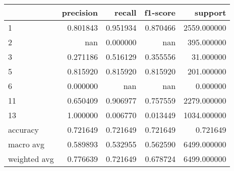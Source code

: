 \begin{tabular}{lrrrr}
\toprule
 & precision & recall & f1-score & support \\
\midrule
1 & 0.801843 & 0.951934 & 0.870466 & 2559.000000 \\
2 & nan & 0.000000 & nan & 395.000000 \\
3 & 0.271186 & 0.516129 & 0.355556 & 31.000000 \\
5 & 0.815920 & 0.815920 & 0.815920 & 201.000000 \\
6 & 0.000000 & nan & nan & 0.000000 \\
11 & 0.650409 & 0.906977 & 0.757559 & 2279.000000 \\
13 & 1.000000 & 0.006770 & 0.013449 & 1034.000000 \\
accuracy & 0.721649 & 0.721649 & 0.721649 & 0.721649 \\
macro avg & 0.589893 & 0.532955 & 0.562590 & 6499.000000 \\
weighted avg & 0.776639 & 0.721649 & 0.678724 & 6499.000000 \\
\bottomrule
\end{tabular}
